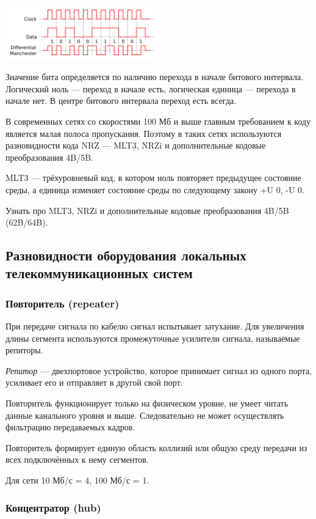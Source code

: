 \documentclass[12pt, russian, oneside, article]{ncc}
\begin{document}
\includegraphics[width=0.5\textwidth]{images/SiSPI/Differential_manchester_encoding.png}

Значение бита определяется по наличию перехода в начале битового интервала. Логический ноль --- переход в начале есть, логическая единица --- перехода в начале нет. В центре битового интервала переход есть всегда.

В современных сетях со скоростями 100 Мб и выше главным требованием к коду является малая полоса пропускания. Поэтому в таких сетях используются разновидности кода NRZ --- MLT3, NRZi и дополнительные кодовые преобразования 4B/5B.

MLT3 --- трёхуровневый код, в котором ноль повторяет предыдущее состояние среды, а единица изменяет состояние среды по следующему закону +U 0, -U 0.

Узнать про MLT3, NRZi и дополнительные кодовые преобразования 4B/5B (62B/64B).
\subsection{Разновидности оборудования локальных телекоммуникационных систем}
\label{sec-4_8}
\subsubsection{Повторитель (repeater)}
\label{sec-4_8_1}


При передаче сигнала по кабелю сигнал испытывает затухание. Для увеличения длины сегмента используются промежуточные усилители сигнала, называемые репиторы.

\emph{Репитор} --- двехпортовое устройство, которое принимает сигнал из одного порта, усиливает его и отправляет в другой свой порт.

Повторитель функционирует только на физическом уровне, не умеет читать данные канального уровня и выше. Следовательно не может осуществлять фильтрацию передаваемых кадров.

Повторитель формирует единую область коллизий или общую среду передачи из всех подключённых к нему сегментов.

Для сети 10 Мб/с = 4, 100 Мб/с = 1.
\subsubsection{Концентратор (hub)}
\label{sec-4_8_2}
\end{document}
